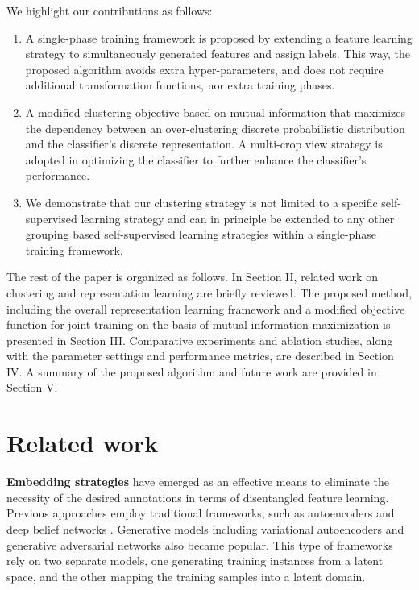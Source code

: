 \documentclass[journal]{IEEEtran}
\begin{document}
We highlight our contributions as follows: 
\begin{enumerate}
    \item A single-phase training framework is proposed by extending a feature learning strategy to simultaneously generated features and assign labels. This way, the proposed algorithm avoids extra hyper-parameters, and does not require additional transformation functions, nor extra training phases.
    \item A modified clustering objective based on mutual information that maximizes the dependency between an over-clustering discrete probabilistic distribution and the classifier's discrete representation. A multi-crop view strategy is adopted in optimizing the classifier to further enhance the classifier's performance.
    \item We demonstrate that our clustering strategy is not limited to a specific self-supervised learning strategy and can in principle be extended to any other grouping based self-supervised learning strategies within a single-phase training framework.
\end{enumerate}
The rest of the paper is organized as follows. In Section II, related work on clustering and representation learning are briefly reviewed. The proposed method, including the overall representation learning framework and a modified objective function for joint training on the basis of mutual information maximization is presented in Section III. Comparative experiments and ablation studies, along with the parameter settings and performance metrics, are described in Section IV. A summary of the proposed algorithm and future work are provided in Section V.    

\section{Related work}

\textbf{Embedding strategies} have emerged as an effective means to eliminate the necessity of the desired annotations in terms of disentangled feature learning. Previous approaches employ traditional frameworks, such as  autoencoders \cite{HintonSalakhutdinov2006b,Vincent2008} and deep belief networks \cite{10.1162/neco.2006.18.7.1527}. Generative models including variational autoencoders \cite{DBLP:conf/aistats/KhemakhemKMH20} and generative adversarial networks \cite{10.5555/2969033.2969125,DBLP:journals/corr/RadfordMC15} also became popular. This type of frameworks rely on two separate models,  one generating training instances from a latent space, and the other mapping the training samples into a latent domain. \par
\end{document}
